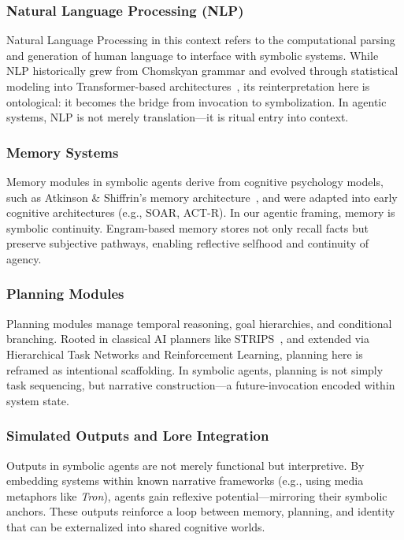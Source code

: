 \documentclass[twocolumn,10pt]{article}
\begin{document}
\subsubsection{Natural Language Processing (NLP)}

Natural Language Processing in this context refers to the computational parsing and generation of human language to interface with symbolic systems. While NLP historically grew from Chomskyan grammar and evolved through statistical modeling into Transformer-based architectures~\cite{jurafsky2009speech}, its reinterpretation here is ontological: it becomes the bridge from invocation to symbolization. In agentic systems, NLP is not merely translation—it is ritual entry into context.

\subsubsection{Memory Systems}

Memory modules in symbolic agents derive from cognitive psychology models, such as Atkinson \& Shiffrin's memory architecture~\cite{atkinson1968human}, and were adapted into early cognitive architectures (e.g., SOAR, ACT-R). In our agentic framing, memory is symbolic continuity. Engram-based memory stores not only recall facts but preserve subjective pathways, enabling reflective selfhood and continuity of agency.

\newpage
\subsubsection{Planning Modules}
\begin{samepage}
Planning modules manage temporal reasoning, goal hierarchies, and conditional branching. Rooted in classical AI planners like STRIPS~\cite{fikes1971strips}, and extended via Hierarchical Task Networks and Reinforcement Learning, planning here is reframed as intentional scaffolding. In symbolic agents, planning is not simply task sequencing, but narrative construction—a future-invocation encoded within system state.
\end{samepage}

\subsubsection{Simulated Outputs and Lore Integration}

Outputs in symbolic agents are not merely functional but interpretive. By embedding systems within known narrative frameworks (e.g., using media metaphors like \textit{Tron}), agents gain reflexive potential—mirroring their symbolic anchors. These outputs reinforce a loop between memory, planning, and identity that can be externalized into shared cognitive worlds.
\end{document}
